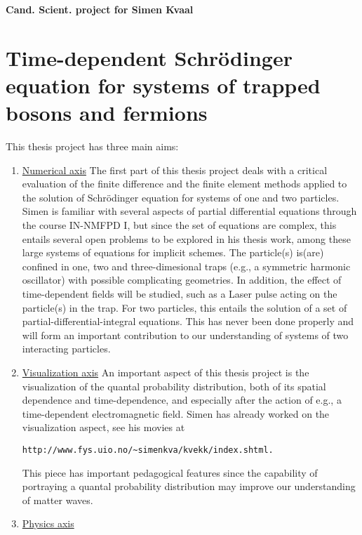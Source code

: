 


\pagestyle{plain}

\begin{center} \huge \bf Cand. Scient. project for Simen Kvaal \end{center}

\section*{Time-dependent Schr\"odinger equation for systems of trapped bosons and fermions}
This thesis project has three main aims:
\begin{enumerate} 
\item \underline{Numerical axis}
The first part of this thesis project deals with  
a critical evaluation of the finite difference and the finite element methods 
applied to the solution of Schr\"odinger equation for systems of 
one and two particles. 
Simen is familiar with several aspects of partial differential
equations through the course IN-NMFPD I, but since the set of equations
are complex, this entails several open problems to be explored in his thesis
work, among these large systems of equations for implicit schemes.
The particle(s) is(are) 
confined in one, two and three-dimesional 
traps (e.g., a symmetric harmonic oscillator)
with possible complicating geometries. 
In addition, the effect of time-dependent fields will be studied, such as
a Laser pulse acting on the particle(s) in the trap. 
For two particles, this entails the solution of 
a set of partial-differential-integral equations. 
This has never been done properly and will form an important contribution
to our understanding of systems of two interacting particles.
\item \underline{Visualization axis} 
An important aspect of this thesis project is the visualization of the quantal
probability distribution, 
both of its spatial dependence and time-dependence, and especially
after the action of e.g., a time-dependent electromagnetic field. 
Simen has already worked on the visualization aspect, see his 
movies at  
\begin{verbatim}
http://www.fys.uio.no/~simenkva/kvekk/index.shtml.
\end{verbatim}
This piece has important pedagogical features since the capability of 
portraying a quantal probability distribution may improve  our understanding 
of matter waves.
\item \underline{Physics axis}   

\end{enumerate}
